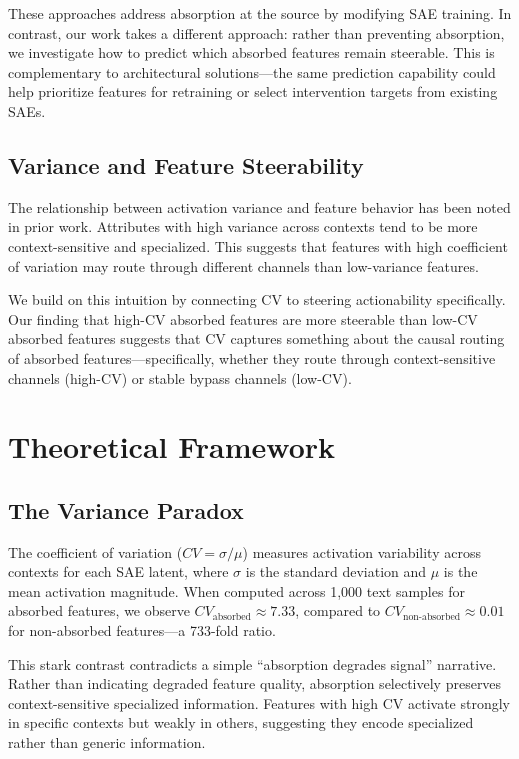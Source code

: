 \documentclass{article}
\begin{document}
These approaches address absorption at the source by modifying SAE training. In contrast, our work takes a different approach: rather than preventing absorption, we investigate how to predict which absorbed features remain steerable. This is complementary to architectural solutions---the same prediction capability could help prioritize features for retraining or select intervention targets from existing SAEs.

\subsection{Variance and Feature Steerability}

The relationship between activation variance and feature behavior has been noted in prior work. Attributes with high variance across contexts tend to be more context-sensitive and specialized. This suggests that features with high coefficient of variation may route through different channels than low-variance features.

We build on this intuition by connecting CV to steering actionability specifically. Our finding that high-CV absorbed features are more steerable than low-CV absorbed features suggests that CV captures something about the causal routing of absorbed features---specifically, whether they route through context-sensitive channels (high-CV) or stable bypass channels (low-CV).

\section{Theoretical Framework}

\subsection{The Variance Paradox}

The coefficient of variation ($CV = \sigma / \mu$) measures activation variability across contexts for each SAE latent, where $\sigma$ is the standard deviation and $\mu$ is the mean activation magnitude. When computed across 1,000 text samples for absorbed features, we observe $CV_{\text{absorbed}} \approx 7.33$, compared to $CV_{\text{non-absorbed}} \approx 0.01$ for non-absorbed features---a 733-fold ratio.

This stark contrast contradicts a simple ``absorption degrades signal'' narrative. Rather than indicating degraded feature quality, absorption selectively preserves context-sensitive specialized information. Features with high CV activate strongly in specific contexts but weakly in others, suggesting they encode specialized rather than generic information.
\end{document}
